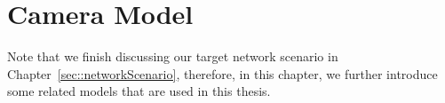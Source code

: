 \section{Camera Model}
\label{sec::dataModel}
Note that we finish discussing our target network scenario in Chapter~\ref{sec::networkScenario}, therefore, in this chapter, we further introduce some related models that are used in this thesis.
%
%

